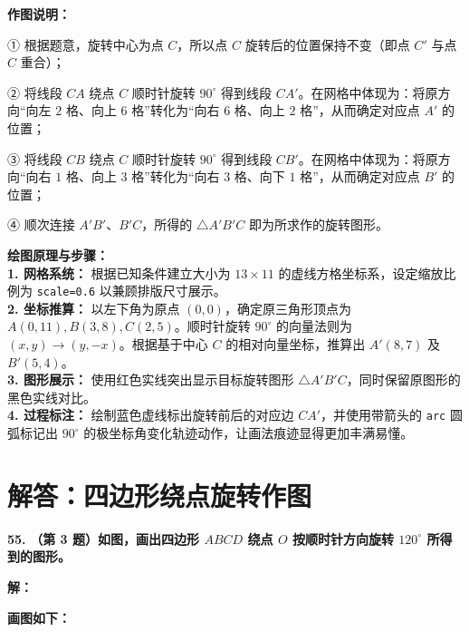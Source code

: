 \documentclass[12pt, a4paper]{ctexrep}
\begin{document}
\vspace{0.4cm}
\textbf{作图说明：}

① 根据题意，旋转中心为点 $C$，所以点 $C$ 旋转后的位置保持不变（即点 $C'$ 与点 $C$ 重合）；

② 将线段 $CA$ 绕点 $C$ 顺时针旋转 $90^\circ$ 得到线段 $CA'$。在网格中体现为：将原方向“向左 $2$ 格、向上 $6$ 格”转化为“向右 $6$ 格、向上 $2$ 格”，从而确定对应点 $A'$ 的位置；

③ 将线段 $CB$ 绕点 $C$ 顺时针旋转 $90^\circ$ 得到线段 $CB'$。在网格中体现为：将原方向“向右 $1$ 格、向上 $3$ 格”转化为“向右 $3$ 格、向下 $1$ 格”，从而确定对应点 $B'$ 的位置；

④ 顺次连接 $A'B'$、$B'C$，所得的 $\triangle A'B'C$ 即为所求作的旋转图形。

\vspace{0.4cm}
{\small\color{blue!70!black}
\textbf{绘图原理与步骤：}\\
\textbf{1. 网格系统：} 根据已知条件建立大小为 $13 \times 11$ 的虚线方格坐标系，设定缩放比例为 \texttt{scale=0.6} 以兼顾排版尺寸展示。\\
\textbf{2. 坐标推算：} 以左下角为原点 $(0,0)$，确定原三角形顶点为 $A(0,11), B(3,8), C(2,5)$。顺时针旋转 $90^\circ$ 的向量法则为 $(x, y) \to (y, -x)$。根据基于中心 $C$ 的相对向量坐标，推算出 $A'(8, 7)$ 及 $B'(5, 4)$。\\
\textbf{3. 图形展示：} 使用红色实线突出显示目标旋转图形 $\triangle A'B'C$，同时保留原图形的黑色实线对比。\\
\textbf{4. 过程标注：} 绘制蓝色虚线标出旋转前后的对应边 $CA'$，并使用带箭头的 \texttt{arc} 圆弧标记出 $90^\circ$ 的极坐标角变化轨迹动作，让画法痕迹显得更加丰满易懂。
}

\newpage

\section{解答：四边形绕点旋转作图}

\vspace{0.6cm}

\textbf{\LARGE 55.} \textbf{（第 3 题）如图，画出四边形 $ABCD$ 绕点 $O$ 按顺时针方向旋转 $120^\circ$ 所得到的图形。}

\vspace{0.4cm}
\textbf{解：}

\textbf{画图如下：}
\end{document}
